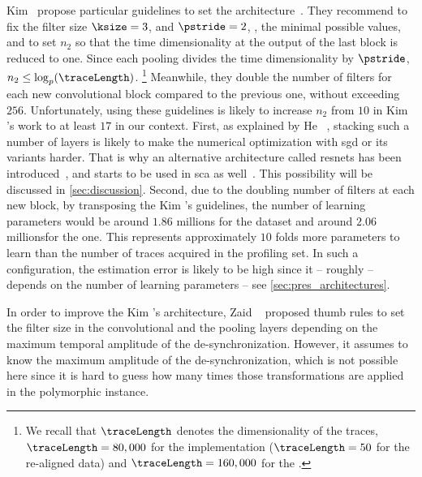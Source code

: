 Kim \etal{}\ propose particular guidelines to set the architecture~\cite{kim_make_2019}.
They recommend to fix the filter size \(\ksize=3\), and \(\pstride=2\), \ie{}, the minimal possible values, and to set \(n_2\) so that the time dimensionality at the output of the last block is reduced to one.
Since each pooling divides the time dimensionality by \(\pstride\), \(n_2 \leq \log_{p}(\traceLength)\).%
\footnote{
	We recall that \(\traceLength\) denotes the dimensionality of the traces, \ie{} \(\traceLength=80,000\) for the \mbedTLS{} implementation (\(\traceLength=50\) for the re-aligned data) and \(\traceLength=160,000\) for the \aeshuitbit{}.
}
Meanwhile, they double the number of filters for each new convolutional block compared to the previous one, without exceeding \(256\).
Unfortunately, using these guidelines is likely to increase \(n_2\) from \(10\) in Kim \etal{}'s work to at least \(17\) in our context.
First, as explained by He \etal{}~\cite{he_deep_2015}, stacking such a number of layers is likely to make the numerical optimization with \gls{sgd} or its variants harder.
That is why an alternative architecture called \glspl{resnet} has been introduced~\cite{he_deep_2015}, and starts to be used in \gls{sca} as well~\cite{zhou_deep_2019,gohr_efficient_2020}.
This possibility will be discussed in \autoref{sec:discussion}.
Second, due to the doubling number of filters at each new block, by transposing the Kim \etal{}'s guidelines, the number of learning parameters would be around \(1.86\) millions for the \mbedTLS{} dataset and around \(2.06\) millionsfor the \aeshuitbit{} one.
This represents approximately \(10\) folds more parameters to learn than the number of traces acquired in the profiling set.
In such a configuration, the estimation error is likely to be high since it -- roughly -- depends on the number of learning parameters -- see \autoref{sec:pres_architectures}.

In order to improve the Kim \etal{}'s architecture, Zaid \etal{}~\cite{zaid_methodology_2019} proposed thumb rules to set the filter size in the convolutional and the pooling layers depending on the maximum temporal amplitude of the de-synchronization.
However, it assumes to know the maximum amplitude of the de-synchronization, which is not possible here since it is hard to guess how many times those transformations are applied in the polymorphic instance.

